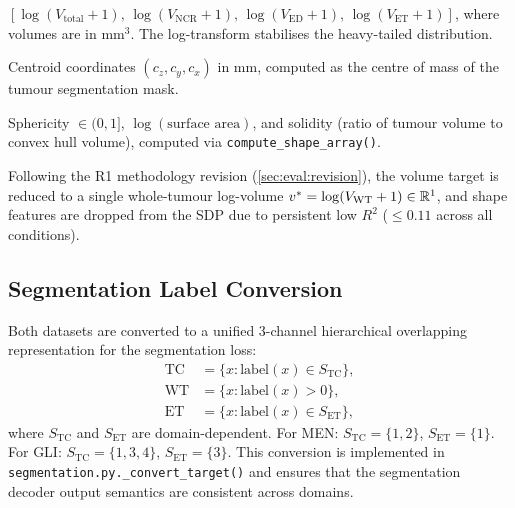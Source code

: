 \begin{description}[leftmargin=*]
  \item[Volume (4 dims):] $[\log(V_{\text{total}}+1),\, \log(V_{\text{NCR}}+1),
    \, \log(V_{\text{ED}}+1),\, \log(V_{\text{ET}}+1)]$, where volumes are in
    mm$^3$. The log-transform stabilises the heavy-tailed distribution.

  \item[Location (3 dims):] Centroid coordinates $(c_z, c_y, c_x)$ in mm,
    computed as the centre of mass of the tumour segmentation mask.

  \item[Shape (3 dims):] Sphericity $\in (0, 1]$, $\log(\text{surface area})$,
    and solidity (ratio of tumour volume to convex hull volume), computed via
    \texttt{compute\_shape\_array()}.
\end{description}

\begin{remark}
  Following the R1 methodology revision (\cref{sec:eval:revision}), the
  volume target is reduced to a single whole-tumour log-volume
  $v^* = \log(V_{\text{WT}} + 1) \in \mathbb{R}^1$, and shape features are dropped
  from the SDP due to persistent low $R^2$ ($\leq 0.11$ across all
  conditions).
\end{remark}

\subsection{Segmentation Label Conversion}
\label{sec:data:labels}

Both datasets are converted to a unified 3-channel hierarchical overlapping
representation for the segmentation loss:
\begin{align}
  \text{TC} &= \{x : \text{label}(x) \in S_{\text{TC}}\}, \\
  \text{WT} &= \{x : \text{label}(x) > 0\}, \\
  \text{ET} &= \{x : \text{label}(x) \in S_{\text{ET}}\},
\end{align}
where $S_{\text{TC}}$ and $S_{\text{ET}}$ are domain-dependent. For MEN:
$S_{\text{TC}} = \{1, 2\}$, $S_{\text{ET}} = \{1\}$. For GLI:
$S_{\text{TC}} = \{1, 3, 4\}$, $S_{\text{ET}} = \{3\}$. This conversion is
implemented in \texttt{segmentation.py.\_convert\_target()} and ensures that
the segmentation decoder output semantics are consistent across domains.

